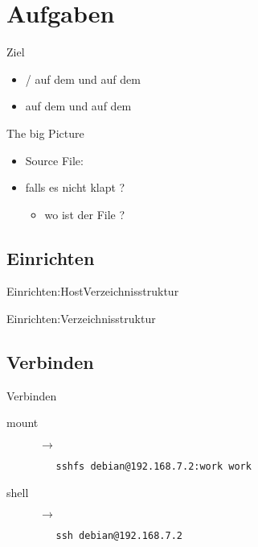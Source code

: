 \section{Aufgaben}
\begin{frame}{Ziel}
 \begin{itemize}
  \item {}/ auf dem \host und auf dem \targetS
  \item {} auf dem \host und auf dem \targetS
 \end{itemize}
\end{frame}


\begin{frame}{The big Picture}
 \begin{itemize}
  \item Source File: 
  \item falls es nicht klapt ?
  \begin{itemize}
   \item wo ist der File ?
  \end{itemize}
 \end{itemize}
\end{frame}

\subsection{Einrichten}
\begin{frame}{Einrichten:Host}{Verzeichnisstruktur}
\end{frame}

\begin{frame}{Einrichten:\targetS}{Verzeichnisstruktur}
\end{frame}

\subsection{Verbinden}

\begin{frame}[fragile]{Verbinden}
 \begin{description}
  \item[mount] \host $\to$ \targetS
  \begin{lstlisting}
   sshfs debian@192.168.7.2:work work
  \end{lstlisting}
 \item[shell]\host $\to$ \targetS
  \begin{lstlisting}
   ssh debian@192.168.7.2
  \end{lstlisting}
 \end{description}
\end{frame}

